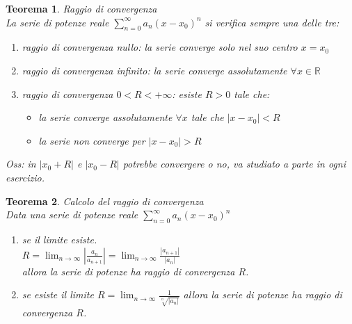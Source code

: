 \documentclass{scrreprt}
\newtheorem{teorema}{Teorema}
\newenvironment{thm}{\begin{mdframed}[backgroundcolor=Ivory2]\begin{teorema}}{\end{teorema}\end{mdframed}}
\begin{document}
\begin{thm}
	Raggio di convergenza\\
	La serie di potenze reale $\sum_{n=0}^\infty a_n \left(x-x_0\right)^n$ si verifica sempre una delle tre:
	\begin{enumerate}
		\item raggio di convergenza nullo: la serie converge solo nel suo centro $x=x_0$
		\item raggio di convergenza infinito: la serie converge assolutamente  $\forall x\in\mathbb{R}$
		\item raggio di convergenza $0<R<+\infty$: esiste $R>0$ tale che:
																\begin{itemize}
																	\item la serie converge assolutamente $\forall x$ tale che $|x-x_0|<R$
																	\item la serie non converge per $|x-x_0|>R$
																\end{itemize}
	\end{enumerate}
	\emph{Oss:} in $|x_0+R|$ e $|x_0-R|$ potrebbe convergere o no, va studiato a parte in ogni esercizio.
\end{thm}

\begin{thm}
	Calcolo del raggio di convergenza\\
	Data una serie di potenze reale $\sum_{n=0}^\infty a_n \left(x-x_0\right)^n$\\
	\begin{enumerate}
		\item[$i)$] se il limite esiste.\\$R=\lim_{n\to\infty} \left\lvert \frac{a_n}{a_{n+1}}\right\rvert = \lim_{n\to\infty} \frac{|a_{n+1}|}{|a_n|}$\\allora la serie di potenze ha raggio di convergenza $R$.
		\item[$ii)$] se esiste il limite $R=\lim_{n\to\infty} \frac{1}{\sqrt[n]{\left\lvert a_n\right\rvert }}$ allora la serie di potenze ha raggio di convergenza $R$.
	\end{enumerate}
\end{thm}
\end{document}
